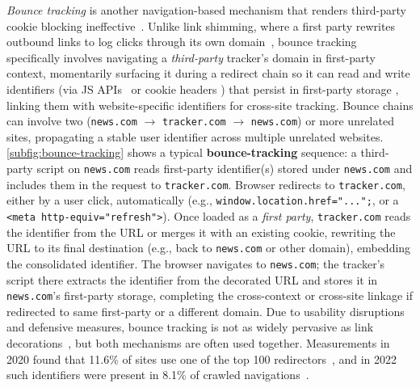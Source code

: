 \textit{Bounce tracking} is another navigation-based mechanism that renders third-party cookie blocking ineffective~\cite{kellyBounceTrackingMitigations2022}.
%
Unlike link shimming, where a first party rewrites outbound links to log clicks through its own domain~\cite{liShimShimmenyEvaluating2020}, bounce tracking specifically involves navigating a \emph{third-party} tracker's domain in first-party context, momentarily surfacing it during a redirect chain so it can read and write identifiers (via JS APIs \symExecution\ or cookie headers \symSharing) that persist in first-party storage \symStorage, linking them with website-specific identifiers for cross-site tracking.
%
Bounce chains can involve two (\texttt{news.com} $\rightarrow$ \texttt{tracker.com} $\rightarrow$ \texttt{news.com}) or more unrelated sites, propagating a stable user identifier across multiple unrelated websites.
%
\autoref{subfig:bounce-tracking} shows a typical \textbf{bounce-tracking} sequence:
%
 a third-party script on \texttt{news.com} reads first-party identifier(s) stored under \texttt{news.com} and
%
 includes them in the request to \texttt{tracker.com}.
%
 Browser redirects to \texttt{tracker.com}, either by a user click, automatically (e.g., \texttt{window.location.href="...";}, or a \texttt{<meta http-equiv="refresh">}).
%
 Once loaded as a \emph{first party}, \texttt{tracker.com} reads the identifier from the URL or merges it with an existing cookie, rewriting the URL to its final destination (e.g., back to \texttt{news.com} or other domain), embedding the consolidated identifier.
%
 The browser navigates to \texttt{news.com}; the tracker’s script there extracts the identifier from the decorated URL and 
%
 stores it in \texttt{news.com}’s first-party storage, completing the cross-context or cross-site linkage if redirected to same first-party or a different domain.
%
Due to usability disruptions and defensive measures, bounce tracking is not as widely pervasive as link decorations~\cite{iqbalKhaleesiBreakerAdvertising2022}, but both mechanisms are often used together.
%
Measurements in 2020 found that 11.6\% of sites use one of the top 100 redirectors~\cite{koopInDepthEvaluationRedirect2020}, and in 2022 such identifiers were present in 8.1\% of crawled navigations~\cite{randallMeasuringUIDSmuggling2022}.

